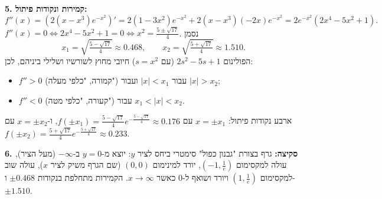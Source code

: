 \begin{solution}
\textbf{5. קמירות ונקודות פיתול:}
\[ f''(x)=\left(2(x-x^3)e^{-x^2}\right)'=2(1-3x^2)e^{-x^2}+2(x-x^3)(-2x)e^{-x^2}=2e^{-x^2}\left(2x^4-5x^2+1\right). \]
$f''(x)=0\iff 2x^4-5x^2+1=0\iff x^2=\frac{5\pm\sqrt{17}}{4}$. נסמן
\[ x_1=\sqrt{\tfrac{5-\sqrt{17}}{4}}\approx0.468,\qquad x_2=\sqrt{\tfrac{5+\sqrt{17}}{4}}\approx1.510. \]
הפולינום $2s^2-5s+1$ (עם $s=x^2$) חיובי מחוץ לשורשיו ושלילי ביניהם, לכן:
\begin{itemize}
  \item $f''>0$ (קמורה, "כלפי מעלה") עבור $|x|<x_1$ ועבור $|x|>x_2$;
  \item $f''<0$ (קעורה, "כלפי מטה") עבור $x_1<|x|<x_2$.
\end{itemize}
ארבע נקודות פיתול: $x=\pm x_1$ עם $f(\pm x_1)=\frac{5-\sqrt{17}}{4}e^{-\frac{5-\sqrt{17}}{4}}\approx0.176$, ו-$x=\pm x_2$ עם $f(\pm x_2)=\frac{5+\sqrt{17}}{4}e^{-\frac{5+\sqrt{17}}{4}}\approx0.233$.

\textbf{6. סקיצה:} גרף בצורת "גבנון כפול" סימטרי ביחס לציר $y$: יוצא מ-$y=0$ ב-$-\infty$ (מעל הציר), עולה למקסימום $\left(-1,\frac1e\right)$, יורד למינימום $(0,0)$ (שם הגרף משיק לציר $x$), עולה שוב למקסימום $\left(1,\frac1e\right)$ ויורד ושואף ל-$0$ כאשר $x\to\infty$. הקמירות מתחלפת בנקודות $\pm0.468$ ו-$\pm1.510$.
\end{solution}
